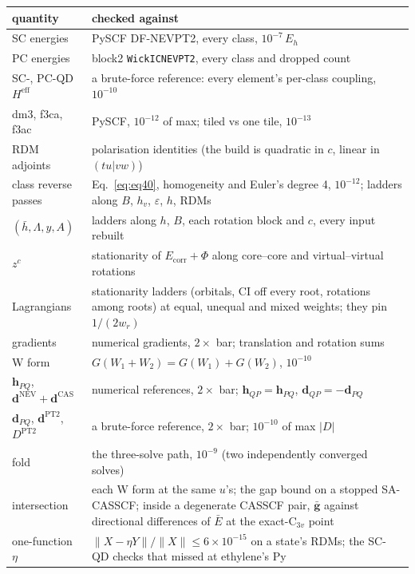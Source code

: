 \documentclass[11pt]{article}
\newcommand{\code}[1]{\texttt{#1}}
\newcommand{\eps}{\varepsilon}
\newcommand{\Ecorr}{E_{\mathrm{corr}}}
\newcommand{\Heff}{H^{\mathrm{eff}}}
\newcommand{\hb}{\bar h}
\newcommand{\Lb}{\Lambda}
\begin{document}
\begin{center}
\small
\begin{tabularx}{\linewidth}{@{}lX@{}}
\toprule
quantity & checked against \\
\midrule
SC energies & PySCF DF-NEVPT2, every class, $10^{-7}\,E_h$ \\
PC energies & block2 \code{WickICNEVPT2}, every class and dropped count \\
SC-, PC-QD $\Heff$ & a brute-force reference: every element's per-class coupling, $10^{-10}$ \\
dm3, f3ca, f3ac & PySCF, $10^{-12}$ of max; tiled vs one tile, $10^{-13}$ \\
RDM adjoints & polarisation identities (the build is quadratic in $c$, linear in $(tu|vw)$) \\
class reverse passes & Eq.~\eqref{eq:eq40}, homogeneity and Euler's degree 4, $10^{-12}$; ladders along $B$, $h_v$, $\eps$, $h$, RDMs \\
$(\hb, \Lb, y, A)$ & ladders along $h$, $B$, each rotation block and $c$, every input rebuilt \\
$z^c$ & stationarity of $\Ecorr + \Phi$ along core--core and virtual--virtual rotations \\
Lagrangians & stationarity ladders (orbitals, CI off every root, rotations among roots) at equal, unequal and mixed weights; they pin $1/(2w_r)$ \\
gradients & numerical gradients, $2\times$ bar; translation and rotation sums \\
W form & $G(W_1+W_2) = G(W_1)+G(W_2)$, $10^{-10}$ \\
$\mathbf h_{PQ}$, $\mathbf d^{\mathrm{NEV}}+\mathbf d^{\mathrm{CAS}}$ & numerical references, $2\times$ bar; $\mathbf h_{QP} = \mathbf h_{PQ}$, $\mathbf d_{QP} = -\mathbf d_{PQ}$ \\
$\mathbf d_{PQ}$, $\mathbf d^{\mathrm{PT2}}$, $D^{\mathrm{PT2}}$ & a brute-force reference, $2\times$ bar; $10^{-10}$ of max $|D|$ \\
fold & the three-solve path, $10^{-9}$ (two independently converged solves) \\
intersection & each W form at the same $u$'s; the gap bound on a stopped SA-CASSCF; inside a degenerate CASSCF pair, $\bar{\mathbf g}$ against directional differences of $\bar E$ at the exact-C$_{3v}$ point \\
one-function $\eta$ & $\|X - \eta Y\|/\|X\| \le 6\times10^{-15}$ on a state's RDMs; the SC-QD checks that missed at ethylene's Py \\

\end{tabularx}
\end{center}
\end{document}
